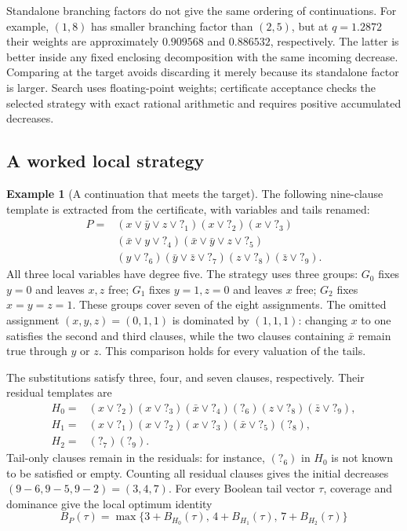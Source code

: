 \documentclass[11pt]{article}
\newcommand{\tail}[1]{\mathord{?}_{#1}}
\theoremstyle{definition}
\newtheorem{example}{Example}
\theoremstyle{remark}
\begin{document}
Standalone branching factors do not give the same ordering of continuations.
For example, $(1,8)$ has smaller branching factor than $(2,5)$, but at
$q=1.2872$ their weights are approximately $0.909568$ and $0.886532$,
respectively. The latter is better inside any fixed enclosing decomposition
with the same incoming decrease. Comparing at the target avoids discarding
it merely because its standalone factor is larger. Search uses floating-point
weights; certificate acceptance checks the selected strategy with exact
rational arithmetic and requires positive accumulated decreases.

\subsection{A worked local strategy}

\begin{example}[A continuation that meets the target]
\label{ex:group}
The following nine-clause template is extracted from the certificate, with
variables and tails renamed:
\begin{equation}
\begin{split}
 P={}&(x\vee\bar y\vee z\vee\tail{1})(x\vee\tail{2})
       (x\vee\tail{3})\\
    & (\bar x\vee y\vee\tail{4})(\bar x\vee\bar y\vee z\vee\tail{5})\\
    & (y\vee\tail{6})(\bar y\vee\bar z\vee\tail{7})
       (z\vee\tail{8})(\bar z\vee\tail{9}).
\end{split}
\label{eq:example-parent}
\end{equation}
All three local variables have degree five. The strategy uses three groups:
$G_0$ fixes $y=0$ and leaves $x,z$ free; $G_1$ fixes $y=1,z=0$ and leaves
$x$ free; $G_2$ fixes $x=y=z=1$. These groups cover seven of the eight
assignments. The omitted assignment $(x,y,z)=(0,1,1)$ is dominated by
$(1,1,1)$: changing $x$ to one satisfies the second and third clauses,
while the two clauses containing $\bar x$ remain true through $y$ or $z$.
This comparison holds for every valuation of the tails.

The substitutions satisfy three, four, and seven clauses, respectively.
Their residual templates are
\begin{align*}
 H_0={}&(x\vee\tail{2})(x\vee\tail{3})(\bar x\vee\tail{4})
         (\tail{6})(z\vee\tail{8})(\bar z\vee\tail{9}),\\
 H_1={}&(x\vee\tail{1})(x\vee\tail{2})(x\vee\tail{3})
         (\bar x\vee\tail{5})(\tail{8}),\\
 H_2={}&(\tail{7})(\tail{9}).
\end{align*}
Tail-only clauses remain in the residuals: for instance, $(\tail{6})$ in
$H_0$ is not known to be satisfied or empty. Counting all residual clauses
gives the initial decreases $(9-6,9-5,9-2)=(3,4,7)$. For every Boolean tail
vector $\tau$, coverage and dominance give the local optimum identity
\begin{equation}
 B_P(\tau)=\max\{3+B_{H_0}(\tau),\,4+B_{H_1}(\tau),\,7+B_{H_2}(\tau)\}
 \label{eq:example-identity}
\end{equation}


\end{example}
\end{document}
